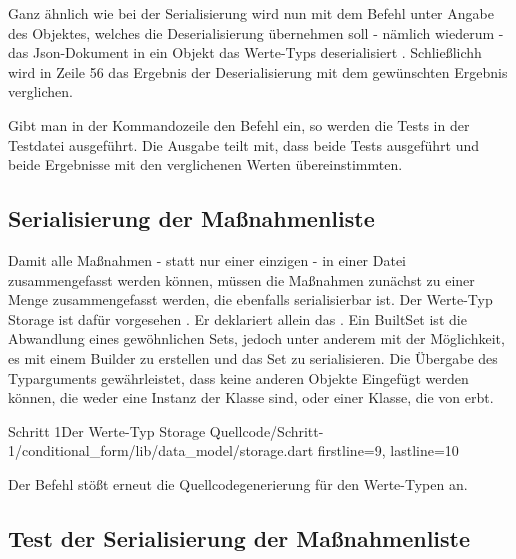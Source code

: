 Ganz ähnlich wie bei der Serialisierung wird nun mit dem Befehl    unter Angabe des Objektes, welches die Deserialisierung übernehmen soll - nämlich wiederum  - das Json-Dokument in ein Objekt das Werte-Typs  deserialisiert . Schließlichh wird in Zeile 56 das Ergebnis der Deserialisierung mit dem gewünschten Ergebnis verglichen.



Gibt man in der Kommandozeile den Befehl    ein, so werden die Tests in der Testdatei ausgeführt. Die Ausgabe  teilt mit, dass beide Tests ausgeführt und beide Ergebnisse mit den verglichenen Werten übereinstimmten.

\subsection{Serialisierung der Maßnahmenliste}

Damit alle Maßnahmen - statt nur einer einzigen - in einer Datei zusammengefasst werden können, müssen die Maßnahmen zunächst zu einer Menge zusammengefasst werden, die ebenfalls serialisierbar ist.
Der Werte-Typ Storage ist dafür vorgesehen \Lst{\ref{lst:Schritt1WerteTypStorage}}.
Er deklariert allein das  .
Ein BuiltSet ist die Abwandlung eines gewöhnlichen Sets, jedoch unter anderem mit der Möglichkeit, es mit einem Builder zu erstellen und das Set zu serialisieren.
Die Übergabe des Typarguments  gewährleistet, dass keine anderen Objekte Eingefügt werden können, die weder eine Instanz der Klasse  sind, oder einer Klasse, die von  erbt.

\begin{alexlisting}{Schritt 1}{Der Werte-Typ Storage}
  {Quellcode/Schritt-1/conditional_form/lib/data_model/storage.dart}
  {firstline=9, lastline=10}
  \label{lst:Schritt1WerteTypStorage}
\end{alexlisting}

Der Befehl   stößt erneut die Quellcodegenerierung für den Werte-Typen  an.

\subsection{Test der Serialisierung der Maßnahmenliste}

